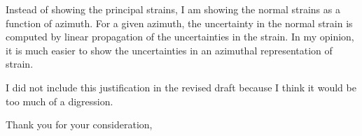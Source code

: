 \documentclass[10pt,a4paper]{letter}
\begin{document}
\begin{letter}{}
Instead of showing the principal strains, I am showing the normal
strains as a function of azimuth. For a given azimuth, the uncertainty
in the normal strain is computed by linear propagation of the
uncertainties in the strain. In my opinion, it is much easier to show
the uncertainties in an azimuthal representation of strain.

I did not include this justification in the revised draft because I
think it would be too much of a digression.

\vspace{1cm}
\closing{Thank you for your consideration,}

\end{letter}
\end{document}
